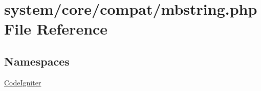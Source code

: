 \hypertarget{mbstring_8php}{}\section{system/core/compat/mbstring.php File Reference}
\label{mbstring_8php}
\subsection*{Namespaces}
\begin{DoxyCompactItemize}
\item 
 \mbox{\hyperlink{namespace_code_igniter}{Code\+Igniter}}
\end{DoxyCompactItemize}
